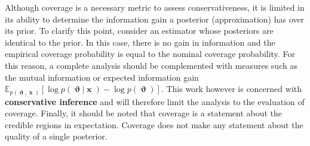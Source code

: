 \documentclass[twoside]{article}
\newtheorem{definition}{Definition}
\DeclareMathOperator{\vtheta}{\boldsymbol\vartheta}
\DeclareMathOperator{\vx}{\boldsymbol x}
\begin{document}
Although coverage is a necessary metric to assess conservativeness, it is limited in its ability to determine the information gain a posterior (approximation) has over its prior. To clarify this point, consider an estimator whose posteriors are identical to the prior. In this case, there is no gain in information and the empirical coverage probability is equal to the nominal coverage probability. For this reason, a complete analysis should be complemented with measures such as the mutual information or expected information gain $\mathbb{E}_{p(\vtheta,\vx)}\left[\log p(\vtheta\vert\vx) - \log p(\vtheta)\right]$.
This work however is concerned with {\bfseries conservative inference} and will therefore limit the analysis to the evaluation of coverage. Finally, it should be noted that coverage is a statement about the credible regions in expectation. Coverage does not make any statement about the quality of a single posterior.
\end{document}
